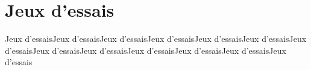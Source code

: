 \chapter{Jeux d'essais}
Jeux d'essaisJeux d'essaisJeux d'essaisJeux d'essaisJeux d'essaisJeux d'essaisJeux d'essaisJeux d'essaisJeux d'essaisJeux d'essaisJeux d'essaisJeux d'essaisJeux d'essais
